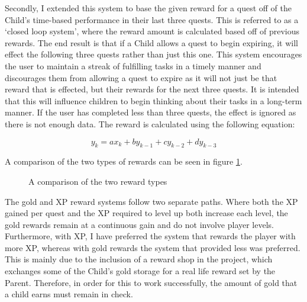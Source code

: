 Secondly, I extended this system to base the given reward for a quest off of the Child's time-based performance in their last three quests.
This is referred to as a `closed loop system', where the reward amount is calculated based off of previous rewards.
The end result is that if a Child allows a quest to begin expiring, it will effect the following three quests rather than just this one.
This system encourages the user to maintain a streak of fulfilling tasks in a timely manner and discourages them from allowing a quest to expire as it will not just be that reward that is effected, but their rewards for the next three quests.
It is intended that this will influence children to begin thinking about their tasks in a long-term manner.
If the user has completed less than three quests, the effect is ignored as there is not enough data.
The reward is calculated using the following equation:

\begin{equation} \label{eq:closedloopreward}
	y_k = ax_k + by_{k-1} + cy_{k-2} + dy_{k-3}
\end{equation}

A comparison of the two types of rewards can be seen in figure \ref{fig:rewardcomparison}.

\begin{figure}[ht]
\centering
{}
\caption{A comparison of the two reward types}
\label{fig:rewardcomparison}
\end{figure}

The gold and XP reward systems follow two separate paths.
Where both the XP gained per quest and the XP required to level up both increase each level, the gold rewards remain at a continuous gain and do not involve player levels.
Furthermore, with XP, I have preferred the system that rewards the player with more XP, whereas with gold rewards the system that provided less was preferred.
This is mainly due to the inclusion of a reward shop in the project, which exchanges some of the Child's gold storage for a real life reward set by the Parent. 
Therefore, in order for this to work successfully, the amount of gold that a child earns must remain in check.

